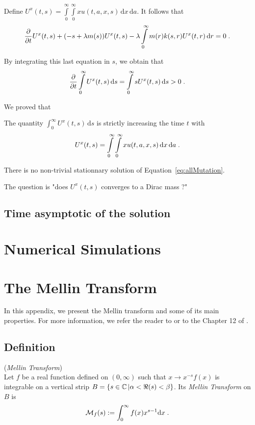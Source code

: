 \documentclass[11pt]{amsart}
\newcommand{\diff}{\,\mathrm{d}}
\begin{document}
Define $U^x(t,s) = \int\limits_0^\infty \int\limits_0^\infty xu(t,a,x,s) \diff x \diff a$. It follows that 
\begin{align*}
    \partialt U^x(t,s)
    + (-s + \lambda m(s)) U^x(t,s)
    -  \lambda \int\limits_0^\infty m(r) k(s,r) U^x(t,r) \diff r = 0
    \eqfinp
\end{align*}

By integrating this last equation in $s$, we obtain that 
    \begin{align*}
    \partialt \int\limits_0^\infty U^x(t,s) \diff s
    = \int\limits_0^\infty s U^x(t,s) \diff s > 0
    \eqfinp
\end{align*}

We proved that
\begin{proposition}
    The quantity $\int_0^\infty U^x(t,s) \diff s$ is strictly increasing \wrt the time $t$ with
    \begin{align*}
        U^x(t,s) = \int\limits_0^\infty \int\limits_0^\infty xu(t,a,x,s) \diff x \diff a
        \eqfinp
    \end{align*}
\end{proposition}

\begin{corollary}
    There is no non-trivial stationnary solution of Equation~\eqref{eq:allMutation}. 
\end{corollary}

The question is "does $U^x(t,s)$ converges to a Dirac mass ?"

\subsection{Time asymptotic of the solution}

\section{Numerical Simulations}

\appendix

\section{The Mellin Transform}

In this appendix, we present the Mellin transform and some of its main properties. For more information, we refer the reader to \cite{flajolet1995mellin} or to the Chapter 12 of \cite{poularikas2018transforms}.
	
\subsection{Definition}
\begin{definition}\label{def:mellin}(\textit{Mellin Transform})\\
Let $f$ be a real function defined on $(0, \infty)$ such that $x\to x^{-s}f(x)$ is integrable on a vertical strip $B = \{ s \in \mathbb{C} \, | \alpha < \Re(s) < \beta\}$. Its \textit{Mellin Transform} on $B$ is
	\begin{equation*}
	\mathcal{M}_f(s) := \int_0^\infty f(x) x^{s-1} \mathrm dx
	\; .
	\end{equation*}
\end{definition}
\end{document}
